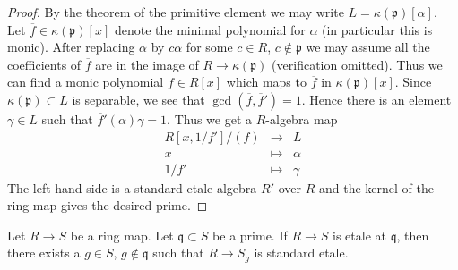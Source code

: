 \begin{proof}
By the theorem of the primitive element we may write
$L = \kappa(\mathfrak p)[\alpha]$. Let
$\overline{f} \in \kappa(\mathfrak p)[x]$
denote the minimal polynomial for $\alpha$ (in particular this is monic).
After replacing $\alpha$ by $c\alpha$ for some $c \in R$,
$c\not \in \mathfrak p$ we may assume all the coefficients
of $\overline{f}$ are in the image of $R \to \kappa(\mathfrak p)$
(verification omitted). Thus we can find a monic polynomial
$f \in R[x]$ which maps to $\overline{f}$ in $\kappa(\mathfrak p)[x]$.
Since $\kappa(\mathfrak p) \subset L$ is separable, we see
that $\gcd(\overline{f}, \overline{f}') = 1$.
Hence there is an element $\gamma \in L$ such that
$\overline{f}'(\alpha) \gamma = 1$. Thus we get a $R$-algebra map
\begin{eqnarray*}
R[x, 1/f']/(f) & \longrightarrow & L \\
x & \longmapsto & \alpha \\
1/f' & \longmapsto & \gamma
\end{eqnarray*}
The left hand side is a standard etale algebra $R'$ over $R$
and the kernel of the ring map gives the desired prime.
\end{proof}






\begin{proposition}
\label{proposition-etale-locally-standard}
Let $R \to S$ be a ring map. Let $\mathfrak q \subset S$ be a prime.
If $R \to S$ is etale at $\mathfrak q$, then there exists
a $g \in S$, $g \not \in \mathfrak q$ such that $R \to S_g$
is standard etale.
\end{proposition}


